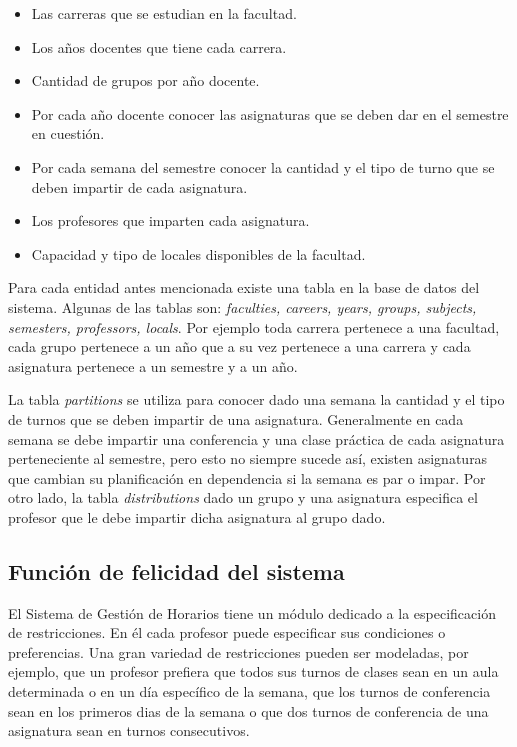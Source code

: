 \begin{itemize}

\item Las carreras que se estudian en la facultad.
\item Los años docentes que tiene cada carrera.
\item Cantidad de grupos por año docente.
\item Por cada año docente conocer las asignaturas que se deben dar en el semestre en cuesti\'on.
\item Por cada semana del semestre conocer la cantidad y el tipo de turno que se deben impartir de cada asignatura.
\item Los profesores que imparten cada asignatura.
\item Capacidad y tipo de locales disponibles de la facultad.

\end{itemize}

Para cada entidad antes mencionada existe una tabla en la base de datos del sistema. Algunas de las tablas son: \emph{faculties, careers, years, groups, subjects, semesters, professors, locals}. Por ejemplo toda carrera pertenece a una facultad, cada grupo pertenece a un año que a su vez pertenece a una carrera y cada asignatura pertenece a un semestre y a un año.

La tabla \emph{partitions} se utiliza para conocer dado una semana la cantidad y el tipo de turnos que se deben impartir de una asignatura. Generalmente en cada semana se debe impartir una conferencia y una clase pr\'actica de cada asignatura perteneciente al semestre, pero esto no siempre sucede as\'i, existen asignaturas que cambian su planificaci\'on en dependencia si la semana es par o impar. Por otro lado, la tabla \emph{distributions} dado un grupo y una asignatura especifica el profesor que le debe impartir dicha asignatura al grupo dado.

\subsection{Funci\'on de felicidad del sistema}

El Sistema de Gesti\'on de Horarios tiene un m\'odulo dedicado a la especificaci\'on de restricciones. En \'el cada profesor puede especificar sus condiciones o preferencias. Una gran variedad de restricciones pueden ser modeladas, por ejemplo, que un profesor prefiera que todos sus turnos de clases sean en un aula determinada o en un d\'ia espec\'ifico de la semana, que los turnos de conferencia sean en los primeros dias de la semana o que dos turnos de conferencia de una asignatura sean en turnos consecutivos.

